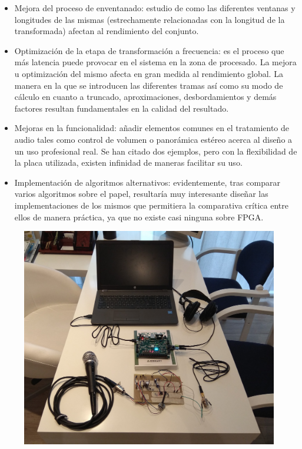 \begin{itemize}
\item Mejora del proceso de enventanado: estudio de como las diferentes ventanas y longitudes de las mismas (estrechamente relacionadas con la longitud de la transformada) afectan al rendimiento del conjunto.
\item Optimización de la etapa de transformación a frecuencia: es el proceso que más latencia puede provocar en el sistema en la zona de procesado. La mejora u optimización del mismo afecta en gran medida al rendimiento global. La manera en la que se introducen las diferentes tramas así como su modo de cálculo en cuanto a truncado, aproximaciones, desbordamientos y demás factores resultan fundamentales en la calidad del resultado.
\item Mejoras en la funcionalidad: añadir elementos comunes en el tratamiento de audio tales como control de volumen o panorámica estéreo acerca al diseño a un uso profesional real. Se han citado dos ejemplos, pero con la flexibilidad de la placa utilizada, existen infinidad de maneras facilitar su uso.
\item Implementación de algoritmos alternativos: evidentemente, tras comparar varios algoritmos sobre el papel, resultaría muy interesante diseñar las implementaciones de los mismos que permitiera la comparativa crítica entre ellos de manera práctica, ya que no existe casi ninguna sobre FPGA.
\end{itemize}

\begin{figure}[!h]
\begin{center}
\includegraphics[width=14cm]{img/final.jpg}
\end{center}
\end{figure}


